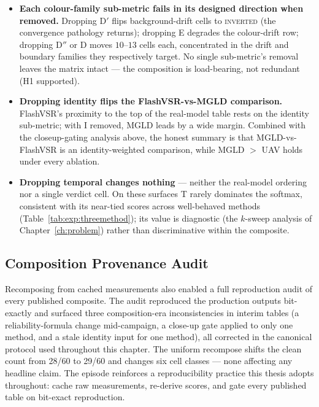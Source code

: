 \begin{itemize}
    \item \textbf{Each colour-family sub-metric fails in its designed
          direction when removed.} Dropping D$'$ flips background-drift cells
          to \textsc{inverted} (the convergence pathology returns); dropping
          E degrades the colour-drift row; dropping D$''$ or D moves
          $10$--$13$ cells each, concentrated in the drift and boundary
          families they respectively target. No single sub-metric's removal
          leaves the matrix intact --- the composition is load-bearing, not
          redundant (H1 supported).
    \item \textbf{Dropping identity flips the FlashVSR-vs-MGLD comparison.}
          FlashVSR's proximity to the top of the real-model table rests on
          the identity sub-metric; with I removed, MGLD leads by a wide
          margin. Combined with the closeup-gating analysis above, the honest
          summary is that MGLD-vs-FlashVSR is an identity-weighted
          comparison, while MGLD $>$ UAV holds under every ablation.
    \item \textbf{Dropping temporal changes nothing} --- neither the
          real-model ordering nor a single verdict cell. On these surfaces T
          rarely dominates the softmax, consistent with its near-tied scores
          across well-behaved methods
          (Table~\ref{tab:exp:threemethod}); its value is diagnostic (the
          $k$-sweep analysis of Chapter~\ref{ch:problem}) rather than
          discriminative within the composite.
\end{itemize}

\subsection{Composition Provenance Audit}
\label{sec:exp:provenance}

Recomposing from cached measurements also enabled a full reproduction audit
of every published composite. The audit reproduced the production outputs
bit-exactly and surfaced three composition-era inconsistencies in interim
tables (a reliability-formula change mid-campaign, a close-up gate applied to
only one method, and a stale identity input for one method), all corrected in
the canonical protocol used throughout this chapter. The uniform recompose
shifts the clean count from 28/60 to 29/60 and changes six cell classes ---
none affecting any headline claim. The episode reinforces a reproducibility
practice this thesis adopts throughout: cache raw measurements, re-derive
scores, and gate every published table on bit-exact reproduction.

